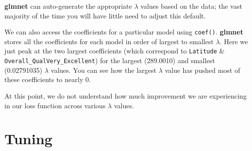 \documentclass[]{krantz}
\makeatletter
\newenvironment{Shaded}{\begin{snugshade}}{\end{snugshade}}
\newcommand{\CommentTok}[1]{\textcolor[rgb]{0.37,0.37,0.37}{\textit{#1}}}
\newcommand{\DecValTok}[1]{\textcolor[rgb]{0.06,0.06,0.06}{#1}}
\newcommand{\KeywordTok}[1]{\textcolor[rgb]{0.27,0.27,0.27}{\textbf{#1}}}
\newcommand{\NormalTok}[1]{#1}
\newcommand{\OperatorTok}[1]{\textcolor[rgb]{0.43,0.43,0.43}{\textbf{#1}}}
\newcommand{\StringTok}[1]{\textcolor[rgb]{0.5,0.5,0.5}{#1}}
\newenvironment{kframe}{%
\medskip{}
\setlength{\fboxsep}{.8em}
 \def\at@end@of@kframe{}%
 \ifinner\ifhmode%
  \def\at@end@of@kframe{\end{minipage}}%
  \begin{minipage}{\columnwidth}%
 \fi\fi%
 \def\FrameCommand##1{\hskip\@totalleftmargin \hskip-\fboxsep
 \colorbox{shadecolor}{##1}\hskip-\fboxsep
     \hskip-\linewidth \hskip-\@totalleftmargin \hskip\columnwidth}%
 \MakeFramed {\advance\hsize-\width
   \@totalleftmargin\z@ \linewidth\hsize
   \@setminipage}}%
 {\par\unskip\endMakeFramed%
 \at@end@of@kframe}
\newenvironment{block}[1]
  {
  \begin{itemize}
  \renewcommand{\labelitemi}{
    \raisebox{-.7\height}[0pt][0pt]{
      {\setkeys{Gin}{width=3em,keepaspectratio}\texttt{[image: icons/\#1]}}
    }
  }
  \setlength{\fboxsep}{1em}
  \begin{kframe}
  \item
  }
  {
  \end{kframe}
  \end{itemize}
  }
\newenvironment{tip}
  {\begin{block}{tip}}
  {\end{block}}
\renewenvironment{Shaded}{\begin{kframe}}{\end{kframe}}
\makeatother
\begin{document}
\begin{tip}
\textbf{glmnet} can auto-generate the appropriate \(\lambda\) values
based on the data; the vast majority of the time you will have little
need to adjust this default.
\end{tip}

We can also access the coefficients for a particular model using \texttt{coef()}. \textbf{glmnet} stores all the coefficients for each model in order of largest to smallest \(\lambda\). Here we just peak at the two largest coefficients (which correspond to \texttt{Latitude} \& \texttt{Overall\_QualVery\_Excellent}) for the largest (289.0010) and smallest (0.02791035) \(\lambda\) values. You can see how the largest \(\lambda\) value has pushed most of these coefficients to nearly 0.

\begin{Shaded}
\end{Shaded}

At this point, we do not understand how much improvement we are experiencing in our loss function across various \(\lambda\) values.

\hypertarget{regression-glmnet-tune}{%
\section{Tuning}\label{regression-glmnet-tune}}
\end{document}
